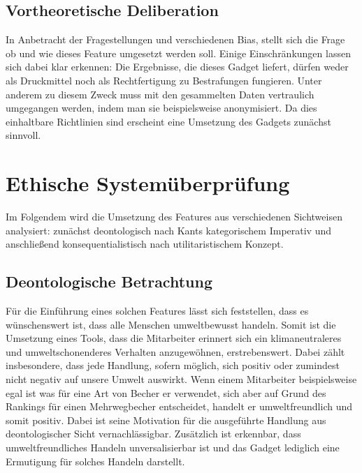 \documentclass[a4paper,12pt,]{article}
\begin{document}
\subsection{Vortheoretische Deliberation}
In Anbetracht der Fragestellungen und verschiedenen Bias, stellt sich
die Frage ob und wie dieses Feature umgesetzt werden soll. Einige
Einschränkungen lassen sich dabei klar erkennen: Die Ergebnisse, die
dieses Gadget liefert, dürfen weder als Druckmittel noch als
Rechtfertigung zu Bestrafungen fungieren. Unter anderem zu diesem
Zweck muss mit den gesammelten Daten vertraulich umgegangen
werden, indem man sie beispielsweise anonymisiert. Da dies einhaltbare
Richtlinien sind erscheint eine Umsetzung des Gadgets zunächst sinnvoll.

\section{Ethische Systemüberprüfung}

Im Folgendem wird die Umsetzung des Features aus verschiedenen
Sichtweisen analysiert: zunächst deontologisch nach Kants kategorischem
Imperativ und anschließend konsequentialistisch nach utilitaristischem
Konzept.

\subsection{Deontologische Betrachtung}

Für die Einführung eines solchen Features lässt sich feststellen, dass es wünschenswert ist, dass alle Menschen umweltbewusst handeln. Somit ist die Umsetzung eines Tools, dass die Mitarbeiter erinnert sich ein klimaneutraleres und umweltschonenderes Verhalten anzugewöhnen, erstrebenswert. Dabei zählt insbesondere, dass jede Handlung, sofern möglich, sich positiv oder zumindest nicht negativ auf unsere Umwelt auswirkt. Wenn einem Mitarbeiter beispielsweise egal ist was für eine Art von Becher er verwendet, sich aber auf Grund des Rankings für einen Mehrwegbecher entscheidet, handelt er umweltfreundlich und somit positiv. Dabei ist seine Motivation für die ausgeführte Handlung aus deontologischer Sicht vernachlässigbar. Zusätzlich ist erkennbar, dass umweltfreundliches Handeln unversalisierbar ist und das Gadget lediglich eine Ermutigung für solches Handeln darstellt.
\end{document}
